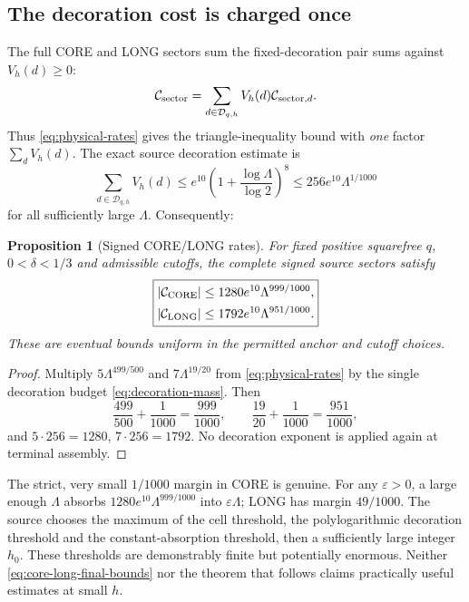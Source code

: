 \documentclass[11pt]{article}
\newtheorem{proposition}[theorem]{Proposition}
\theoremstyle{definition}
\theoremstyle{remark}
\newcommand{\1}{\mathbf 1}
\begin{document}
\subsection{The decoration cost is charged once}

The full CORE and LONG sectors sum the fixed-decoration pair
sums against $V_h(d)\ge0$:
\begin{equation}\label{eq:decoration-aggregate}
 \mathcal C_{\rm sector}=
 \sum_{d\in\mathcal D_{q,h}}V_h(d)
       \mathcal C_{{\rm sector},d}.
\end{equation}
Thus \eqref{eq:physical-rates} gives the triangle-inequality
bound with \emph{one} factor $\sum_dV_h(d)$. The exact
source decoration estimate is
\begin{equation}\label{eq:decoration-mass}
 \sum_{d\in\mathcal D_{q,h}}V_h(d)
 \le e^{10}\left(1+\frac{\log\Lambda}{\log2}\right)^8
 \le256e^{10}\Lambda^{1/1000}
\end{equation}
for all sufficiently large $\Lambda$. Consequently:
\begin{proposition}[Signed CORE/LONG rates]\label{prop:sector-sublog}
For fixed positive squarefree $q$, $0<\delta<1/3$ and
admissible cutoffs, the complete signed source sectors satisfy
\begin{equation}\label{eq:core-long-final-bounds}
 \boxed{\begin{aligned}
 |\mathcal C_{\rm CORE}|&\le1280e^{10}\Lambda^{999/1000},\\
 |\mathcal C_{\rm LONG}|&\le1792e^{10}\Lambda^{951/1000}.
 \end{aligned}}
\end{equation}
These are eventual bounds uniform in the permitted anchor and
cutoff choices.
\end{proposition}
\begin{proof}
Multiply $5\Lambda^{499/500}$ and
$7\Lambda^{19/20}$ from \eqref{eq:physical-rates} by the
single decoration budget \eqref{eq:decoration-mass}. Then
\[
 \frac{499}{500}+\frac1{1000}=\frac{999}{1000},
 \qquad
 \frac{19}{20}+\frac1{1000}=\frac{951}{1000},
\]
and $5\cdot256=1280$, $7\cdot256=1792$.
No decoration exponent is applied again at terminal assembly.
\end{proof}

The strict, very small $1/1000$ margin in CORE is genuine.
For any $\varepsilon>0$, a large enough $\Lambda$ absorbs
$1280e^{10}\Lambda^{999/1000}$ into
$\varepsilon\Lambda$; LONG has margin $49/1000$.
The source chooses the maximum of the cell threshold, the
polylogarithmic decoration threshold and the constant-absorption
threshold, then a sufficiently large integer $h_0$.
These thresholds are demonstrably finite but potentially enormous.
Neither \eqref{eq:core-long-final-bounds} nor the theorem that
follows claims practically useful estimates at small $h$.
\end{document}
